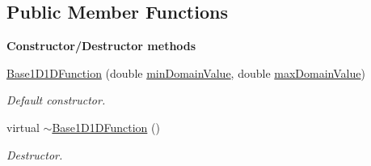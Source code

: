 \subsection*{Public Member Functions}
\begin{Indent}{\bf Constructor/\-Destructor methods}\par
\begin{DoxyCompactItemize}
\item 
\hyperlink{class_q_u_e_s_o_1_1_base1_d1_d_function_a8e8c0f8d500675e4acfd4d7043000791}{Base1\-D1\-D\-Function} (double \hyperlink{class_q_u_e_s_o_1_1_base1_d1_d_function_a4c110e621ef1ac557bbcc60d41f5a3c2}{min\-Domain\-Value}, double \hyperlink{class_q_u_e_s_o_1_1_base1_d1_d_function_ad2b80d0c52c0cb56c89f70f30b3bb19e}{max\-Domain\-Value})
\begin{DoxyCompactList}\small\item\em Default constructor. \end{DoxyCompactList}\item 
virtual \hyperlink{class_q_u_e_s_o_1_1_base1_d1_d_function_a0512da686e14fe3b0544f84432ea322e}{$\sim$\-Base1\-D1\-D\-Function} ()
\begin{DoxyCompactList}\small\item\em Destructor. \end{DoxyCompactList}\end{DoxyCompactItemize}
\end{Indent}

